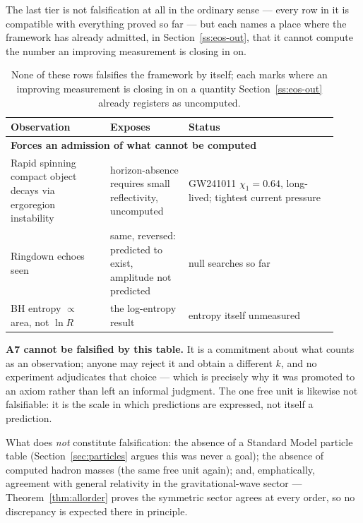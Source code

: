 \documentclass[pdflatex,sn-mathphys-num]{sn-jnl}
\theoremstyle{thmstyleone}
\theoremstyle{thmstylethree}
\theoremstyle{thmstyletwo}
\begin{document}
The last tier is not falsification at all in the ordinary sense — every
row in it is compatible with everything proved so far — but each names a
place where the framework has already admitted, in
Section~\ref{ss:eos-out}, that it cannot compute the number an
improving measurement is closing in on.

\begin{table}[htbp]
\centering
\small
\begin{tabular}{p{0.28\linewidth}p{0.22\linewidth}p{0.42\linewidth}}
\toprule
Observation & Exposes & Status \\
\midrule
\multicolumn{3}{l}{\textbf{Forces an admission of what cannot be computed}}\\
Rapid spinning compact object decays via ergoregion instability & horizon-absence requires small reflectivity, uncomputed & GW241011 $\chi_1=0.64$, long-lived; tightest current pressure \\
Ringdown echoes seen & same, reversed: predicted to exist, amplitude not predicted & null searches so far \\
BH entropy $\propto$ area, not $\ln R$ & the log-entropy result & entropy itself unmeasured \\
\bottomrule
\end{tabular}
\caption{None of these rows falsifies the framework by itself; each marks where an improving measurement is closing in on a quantity Section~\ref{ss:eos-out} already registers as uncomputed.}
\label{tab:falsify-admission}
\end{table}
\FloatBarrier

\textbf{A7 cannot be falsified by this table.} It is a commitment about
what counts as an observation; anyone may reject it and obtain a
different $k$, and no experiment adjudicates that choice — which is
precisely why it was promoted to an axiom rather than left an informal
judgment. The one free unit is likewise not falsifiable: it is the scale
in which predictions are expressed, not itself a prediction.

What does \emph{not} constitute falsification: the absence of a Standard
Model particle table (Section~\ref{sec:particles} argues this was never
a goal); the absence of computed hadron masses (the same free unit
again); and, emphatically, agreement with general relativity in the
gravitational-wave sector — Theorem~\ref{thm:allorder} proves the
symmetric sector agrees at every order, so no discrepancy is expected
there in principle.

\end{document}
